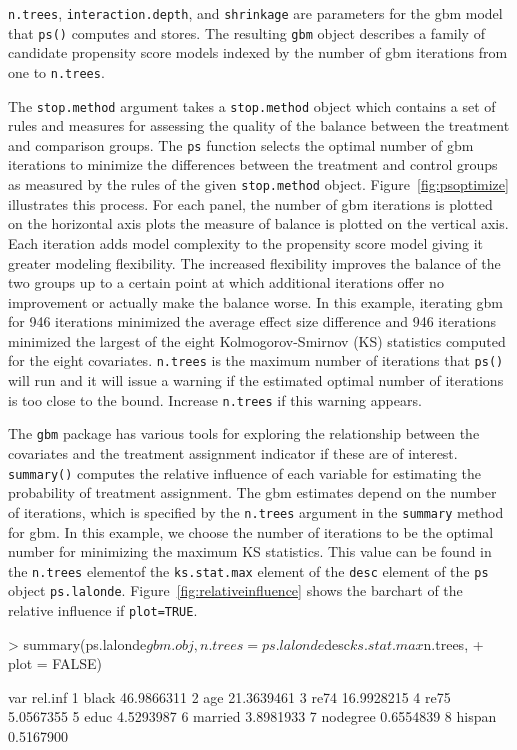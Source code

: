 \documentclass{article}
\begin{document}
\texttt{n.trees}, \texttt{interaction.depth}, and \texttt{shrinkage} are
parameters for the gbm model that \texttt{ps()} computes and stores. The
resulting \texttt{gbm} object describes a family of candidate propensity score models
indexed by the number of gbm iterations from one to \texttt{n.trees}. 

The \texttt{stop.method} argument
takes a \texttt{stop.method} object which contains a set of rules and measures
for assessing the quality of the balance between the treatment and comparison
groups. The \texttt{ps} function selects the optimal number of gbm iterations
to minimize the differences between the treatment and control groups as
measured by the rules of the given \texttt{stop.method} object. Figure~\ref{fig:psoptimize}
illustrates this process. For each panel, the number of gbm iterations is plotted on the horizontal axis plots 
the measure of balance is plotted on the vertical axis.  Each iteration adds model complexity to the
propensity score model giving it greater modeling flexibility. The increased
flexibility improves the balance of the two groups up to a certain point at
which additional iterations offer no improvement or actually make the balance
worse. In this example, iterating gbm for
946 iterations minimized the average
effect size difference and 946
iterations minimized the largest of the eight Kolmogorov-Smirnov (KS) statistics computed for the
eight covariates. \texttt{n.trees} is the maximum number of iterations that
\texttt{ps()} will run and it will issue a warning if the estimated optimal
number of iterations is too close to the bound. Increase \texttt{n.trees} if
this warning appears.

The \texttt{gbm} package has various tools for exploring the relationship
between the covariates and the treatment assignment indicator if these are of
interest. \texttt{summary()} computes the relative influence of each variable
for estimating the probability of treatment assignment.  The gbm estimates depend on the number of iterations, 
which is specified by the \texttt{n.trees} argument in the \texttt{summary} method for gbm.  In this example,
we choose the number of iterations to be the optimal number for minimizing the maximum KS statistics.  This value
can be found in the \texttt{n.trees} elementof the \texttt{ks.stat.max} element of the \texttt{desc} element of the 
\texttt{ps} object \texttt{ps.lalonde}.
Figure~\ref{fig:relativeinfluence} shows the barchart of the relative influence
if \texttt{plot=TRUE}.


\begin{Schunk}
\begin{Sinput}
> summary(ps.lalonde$gbm.obj, n.trees = ps.lalonde$desc$ks.stat.max$n.trees, 
+     plot = FALSE)
\end{Sinput}
\begin{Soutput}
       var    rel.inf
1    black 46.9866311
2      age 21.3639461
3     re74 16.9928215
4     re75  5.0567355
5     educ  4.5293987
6  married  3.8981933
7 nodegree  0.6554839
8   hispan  0.5167900
\end{Soutput}
\end{Schunk}
\end{document}
